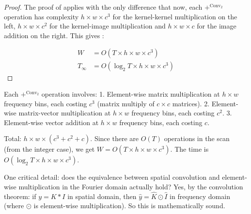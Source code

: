 \begin{proof}
The proof of  applies with the only difference that now, each $+^{\mathrm{Conv}_2}$ operation has complexity $h \times w \times c^3$ for the kernel-kernel multiplication on the left, $h \times w \times c^2$ for the kernel-image multiplication and $h \times w \times c$ for the image addition on the right. This gives :

\begin{align}
\label{eq:W_spectral}
    W&= O(T \times h \times w \times c^3)\\
\label{eq:T_spectral}
    T_\infty&= O(\log_2T \times h \times w \times c^3)
\end{align}
\end{proof}

\begin{ThomasAnnotation}
Each $+^{\mathrm{Conv}_2}$ operation involves:
1. Element-wise matrix multiplication at $h \times w$ frequency bins, each costing $c^3$ (matrix multiply of $c \times c$ matrices).
2. Element-wise matrix-vector multiplication at $h \times w$ frequency bins, each costing $c^2$.
3. Element-wise vector addition at $h \times w$ frequency bins, each costing $c$.

Total: $h \times w \times (c^3 + c^2 + c)$. Since there are $O(T)$ operations in the scan (from the integer case), we get $W = O(T \times h \times w \times c^3)$. The time is $O(\log_2 T \times h \times w \times c^3)$.

One critical detail: does the equivalence between spatial convolution and element-wise multiplication in the Fourier domain actually hold? Yes, by the convolution theorem: if $y = K \ast I$ in spatial domain, then $\hat{y} = \hat{K} \odot \hat{I}$ in frequency domain (where $\odot$ is element-wise multiplication). So this is mathematically sound.
\end{ThomasAnnotation}




